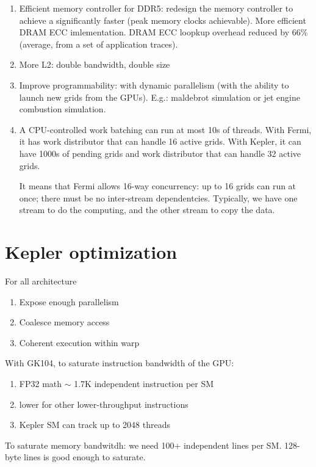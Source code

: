 \begin{enumerate}
  \item Efficient memory controller for DDR5: redesign the memory controller to
  achieve a significantly faster (peak memory clocks achievable). More efficient
  DRAM ECC imlementation. DRAM ECC loopkup overhead reduced by 66\% (average,
  from a set of application traces).
  
  \item More L2: double bandwidth, double size
  
  \item Improve programmability: with dynamic parallelism (with the ability to
  launch new grids from the GPUs). E.g.: maldebrot simulation or jet engine
  combustion simulation. 
  
  \item A CPU-controlled work batching can run at most 10s of threads. With
  Fermi, it has work distributor that can handle 16 active grids. With Kepler,
  it can have 1000s of pending grids and work distributor that can handle 32
  active grids. 
  
  It means that Fermi allows 16-way concurrency: up to 16 grids can run at once;
  there must be no inter-stream dependentcies. Typically, we have one stream to
  do the computing, and the other stream to copy the data. 
\end{enumerate}


\section{Kepler optimization}

For all architecture 
\begin{enumerate}
  \item Expose enough parallelism
  \item Coalesce memory access
  \item Coherent execution within warp
\end{enumerate}

With GK104, to saturate instruction bandwidth of the GPU:
\begin{enumerate}
  \item FP32 math $\sim$ 1.7K independent instruction per SM
  \item lower for other lower-throughput instructions
  \item Kepler SM can track up to 2048 threads
\end{enumerate}
To saturate memory bandwitdh: we need 100+ independent lines per SM. 128-byte
lines is good enough to saturate. 


